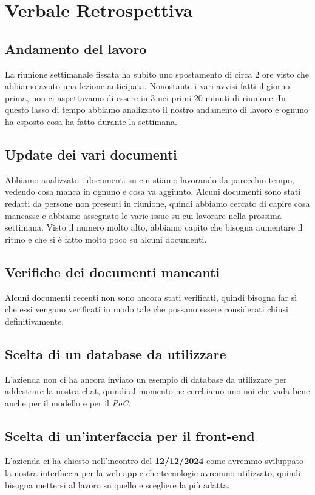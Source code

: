 \documentclass{article}
\begin{document}
\newpage
\section{Verbale Retrospettiva}
\subsection{Andamento del lavoro}
La riunione settimanale fissata ha subito uno spostamento di circa 2 ore visto che abbiamo avuto una lezione anticipata. Nonostante i vari avvisi fatti il giorno prima, non ci aspettavamo di essere in 3 nei primi 20 minuti di riunione. In questo lasso di tempo abbiamo analizzato il nostro andamento di lavoro e ognuno ha esposto cosa ha fatto durante la settimana.
\subsection{Update dei vari documenti}
Abbiamo analizzato i documenti su cui stiamo lavorando da parecchio tempo, vedendo cosa manca in ognuno e cosa va aggiunto. Alcuni documenti sono stati redatti da persone non presenti in riunione, quindi abbiamo cercato di capire cosa mancasse e abbiamo assegnato le varie issue su cui lavorare nella prossima settimana. Visto il numero molto alto, abbiamo capito che bisogna aumentare il ritmo e che si è fatto molto poco su alcuni documenti.
\subsection{Verifiche dei documenti mancanti}
Alcuni documenti recenti non sono ancora stati verificati, quindi bisogna far sì che essi vengano verificati in modo tale che possano essere considerati chiusi definitivamente.
\subsection{Scelta di un database da utilizzare}
L'azienda non ci ha ancora inviato un esempio di database da utilizzare per addestrare la nostra chat, quindi al momento ne cerchiamo uno noi che vada bene anche per il modello e per il \emph{PoC}.
\subsection{Scelta di un'interfaccia per il front-end}
L'azienda ci ha chiesto nell'incontro del \textbf{12/12/2024} come avremmo sviluppato la nostra interfaccia per la web-app e che tecnologie avremmo utilizzato, quindi bisogna mettersi al lavoro su quello e scegliere la più adatta.
\end{document}

